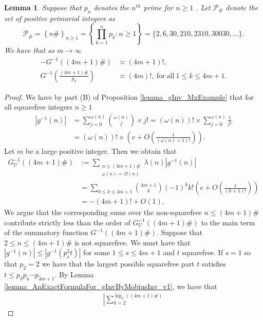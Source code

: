 \documentclass[11pt,reqno,a4letter]{article}
\numberwithin{figure}{section}
\numberwithin{table}{section}
\newcommand{\seqnum}[1]{\href{http://oeis.org/#1}{\color{ProcessBlue}{\underline{#1}}}}
\theoremstyle{plain}
\newtheorem{lemma}[theorem]{Lemma}
\numberwithin{theorem}{section}
\theoremstyle{definition}
\begin{document}
\begin{lemma}
\label{theorem_PrimorialSeqGInvCalcs_v1} 
Suppose that $p_n$ denotes the $n^{th}$ prime for $n \geq 1$ 
\cite[\seqnum{A000040}]{OEIS}. 
Let $\mathcal{P}_{\#}$ denote the set of positive primorial integers as 
\cite[\seqnum{A002110}]{OEIS} 
\[
\mathcal{P}_{\#} = \left\{n\#\right\}_{n \geq 1} = \left\{\prod_{k=1}^{n} p_k : n \geq 1\right\} = 
     \{2, 6, 30, 210, 2310, 30030, \ldots\}. 
\]
We have that as $m \rightarrow \infty$  
\begin{align*}
-G^{-1}((4m+1)\#) & \asymp (4m+1)!, \\ 
G^{-1}\left(\frac{(4m+1)\#}{p_k}\right) & \asymp (4m)!, 
     \mathrm{\ for\ all\ } 1 \leq k \leq 4m+1. 
\end{align*} 
\end{lemma}
\begin{proof} 
We have by part (B) of Proposition \ref{lemma_gInv_MxExample} 
that for all squarefree integers 
$n \geq 1$ 
\begin{align*} 
|g^{-1}(n)| & = \sum_{j=0}^{\omega(n)} \binom{\omega(n)}{j} \times j! 
     = (\omega(n))! \times \sum_{j=0}^{\omega(n)} \frac{1}{j!} \\ 
     & = (\omega(n))! \times \left(e + O\left(\frac{1}{(\omega(n)+1)!}\right)\right). 
\end{align*} 
Let $m$ be a large positive integer. 
Then we obtain that 
\begin{align*} 
G_{U}^{-1}((4m+1)\#) & := \sum_{\substack{n \leq (4m+1)\# \\ \omega(n)=\Omega(n)}} \lambda(n) |g^{-1}(n)| \\ 
     & = \sum_{0 \leq k \leq 4m+1} \binom{4m+1}{k} (-1)^{k} k! 
     \left(e + O\left(\frac{1}{(k+1)!}\right)\right) \\ 
     & = -(4m+1)! + O(1). 
\end{align*} 
We argue that the corresponding sums over the non-squarefree $n \leq (4m+1)\#$ 
contribute strictly less than the order of $G_{U}^{-1}((4m+1)\#)$ to the 
main term of the summatory function $G^{-1}((4m+1)\#)$. 
Suppose that $2 \leq n \leq (4m+1)\#$ is not squarefree. We must have that 
$|g^{-1}(n)| \leq |g^{-1}(p_s^2 t)|$ for some $1 \leq s \leq 4m+1$ and $t$ squarefree. 
If $s = 1$ so that $p_2 = 2$ we have that the largest possible squarefree part $t$ 
satisfies $t \leq p_3p_4 \cdots p_{4m+1}$. 
By Lemma \ref{lemma_AnExactFormulaFor_gInvByMobiusInv_v1}, we have that 
\begin{align*} 
\left\lvert \sum_{k=2}^{\log_2\left((4m+1)\#\right)} 

\end{align*}
\end{proof}
\end{document}
